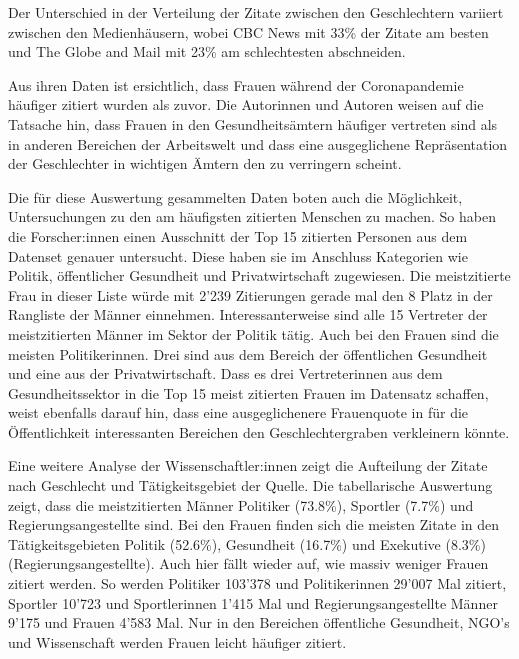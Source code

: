 Der Unterschied in der Verteilung der Zitate zwischen den Geschlechtern variiert zwischen den Medienhäusern,
wobei CBC News mit 33\% der Zitate am besten und The Globe and Mail mit 23\% am schlechtesten abschneiden.

Aus ihren Daten ist ersichtlich, dass Frauen während der Coronapandemie häufiger zitiert wurden als zuvor.
Die Autorinnen und Autoren weisen auf die Tatsache hin, dass Frauen in den Gesundheitsämtern häufiger vertreten sind als in
anderen Bereichen der Arbeitswelt und dass eine ausgeglichene Repräsentation der Geschlechter in wichtigen
Ämtern den  zu verringern scheint.

Die für diese Auswertung gesammelten Daten boten auch die Möglichkeit, Untersuchungen zu den am häufigsten zitierten
Menschen zu machen. So haben die Forscher:innen einen Ausschnitt der Top 15 zitierten Personen aus dem Datenset genauer
untersucht. Diese haben sie im Anschluss Kategorien wie Politik, öffentlicher Gesundheit und Privatwirtschaft zugewiesen.
Die meistzitierte Frau in dieser Liste würde mit 2'239 Zitierungen gerade mal den 8 Platz in der Rangliste der Männer
einnehmen. Interessanterweise sind alle 15 Vertreter der meistzitierten Männer im Sektor der Politik tätig. Auch bei den
Frauen sind die meisten Politikerinnen. Drei sind aus dem Bereich der öffentlichen Gesundheit und eine aus der Privatwirtschaft.
Dass es drei Vertreterinnen aus dem Gesundheitssektor in die Top 15 meist zitierten Frauen im Datensatz schaffen, weist ebenfalls
darauf hin, dass eine ausgeglichenere Frauenquote in für die Öffentlichkeit interessanten Bereichen den Geschlechtergraben verkleinern
könnte.


Eine weitere Analyse der Wissenschaftler:innen zeigt die Aufteilung der Zitate nach Geschlecht und Tätigkeitsgebiet der Quelle.
Die tabellarische Auswertung zeigt, dass die meistzitierten Männer Politiker (73.8\%), Sportler (7.7\%) und Regierungsangestellte sind.
Bei den Frauen finden sich die meisten Zitate in den Tätigkeitsgebieten Politik (52.6\%), Gesundheit (16.7\%) und Exekutive (8.3\%) (Regierungsangestellte).
Auch hier fällt wieder auf, wie massiv weniger Frauen zitiert werden. So werden Politiker 103'378 und Politikerinnen 29'007 Mal zitiert,
Sportler 10'723 und Sportlerinnen 1'415 Mal und Regierungsangestellte Männer 9'175 und Frauen 4'583 Mal. Nur in den Bereichen öffentliche Gesundheit,
NGO's und Wissenschaft werden Frauen leicht häufiger zitiert.

